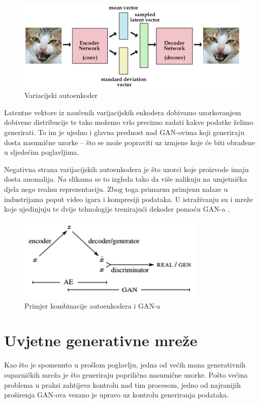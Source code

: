 \documentclass[lmodern, utf8, seminar]{fer}
\begin{document}
\begin{figure}[H]
    \centering
    \includegraphics[width=1\textwidth]{vae}
    \caption{Variacijski autoenkoder \cite{website:kvfrans}}
    \label{fig:vae}
\end{figure}

\newpage
Latentne vektore iz naučenih varijacijskih enkodera dobivamo uzorkovanjem dobivene distribucije te tako možemo vrlo precizno zadati kakve podatke želimo generirati. To im je ujedno i glavna prednost nad GAN-ovima koji generiraju dosta nasumične uzorke -- što se može popraviti uz izmjene koje će biti obrađene u sljedećim poglavljima.
\newline

Negativna strana varijacijskih autoenkodera je što uzorci koje proizvode imaju dosta anomalija. Na slikama se to izgleda tako da više nalikuju na umjetnička djela nego realnu reprezentaciju. Zbog toga primarnu primjenu nalaze u industrijama poput video igara i kompresiji podataka. U istraživanju su i mreže koje ujedinjuju te dvije tehnologije trenirajući dekoder pomoću GAN-a \cite{larsen2015autoencoding}.

\begin{figure}[H]
    \centering
    \includegraphics[width=0.8\textwidth]{vae-gan}
    \caption{Primjer kombinacije autoenkodera i GAN-a \cite{larsen2015autoencoding}}
    \label{fig:vae-gan}
\end{figure}




\chapter{Uvjetne generativne mreže}
Kao što je spomenuto u prošlom poglavlju, jedna od većih mana generativnih suparničkih mreža je što generiraju poprilično nasumične uzorke. Pošto većina problema u praksi zahtijeva kontrolu nad tim procesom, jedno od najranijih proširenja GAN-ova vezano je upravo uz kontrolu generiranja podataka. 
\newline
\end{document}
